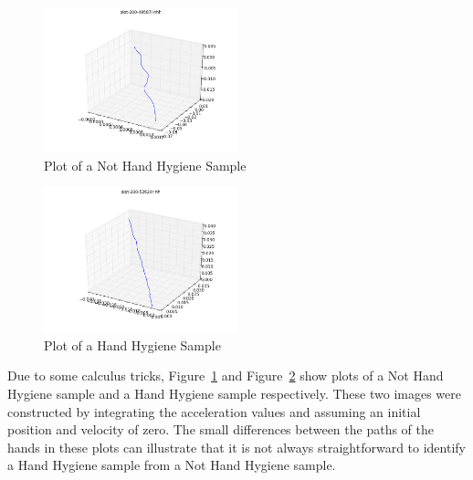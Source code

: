 \documentclass[]{report}
\begin{document}
\begin{figure}
	\centering
	\includegraphics[width=0.5\textwidth]{../code/plots/plot-200-49587l}
	\caption{Plot of a Not Hand Hygiene Sample}
	\label{nhh-plot}
\end{figure}

\begin{figure}
	\centering
	\includegraphics[width=0.5\textwidth]{../code/plots/plot-200-52624r}
	\caption{Plot of a Hand Hygiene Sample}
	\label{hh-plot}
\end{figure}

Due to some calculus tricks, Figure~\ref{nhh-plot} and Figure~\ref{hh-plot} show plots of a Not Hand Hygiene sample and a Hand Hygiene sample respectively. These two images were constructed by integrating the acceleration values and assuming an initial position and velocity of zero. The small differences between the paths of the hands in these plots can illustrate that it is not always straightforward to identify a Hand Hygiene sample from a Not Hand Hygiene sample.
\end{document}
